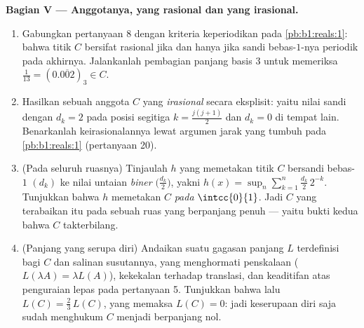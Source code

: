 \begin{problem}[{Soal akhir pekan --- \omterm{pb:b1:topology:1}{himpunan Cantor} sepertiga
tengah: panjang nol, takterbilang, sempurna, dan $C + C =
\intcc{0}{2}$}]
\medskip
\noindent\textbf{Bagian V --- Anggotanya, yang rasional dan yang irasional.}
\begin{enumerate}[resume]
  \item Gabungkan pertanyaan 8 dengan kriteria keperiodikan pada
        \cref{pb:b1:reals:1}: bahwa titik $C$ bersifat rasional jika dan
        hanya jika sandi bebas-$1$-nya periodik pada akhirnya. Jalankanlah
        pembagian panjang basis $3$ untuk memeriksa $\frac1{13} =
        (0.\overline{002})_3 \in C$.
  \item Hasilkan sebuah anggota $C$ yang \emph{irasional} secara eksplisit:
        yaitu nilai sandi dengan $d_k = 2$ pada posisi
        segitiga $k = \frac{j(j+1)}{2}$ dan $d_k = 0$
        di tempat lain. Benarkanlah keirasionalannya lewat argumen jarak yang
        tumbuh pada \cref{pb:b1:reals:1} (pertanyaan 20).
  \item (Pada seluruh ruasnya) Tinjaulah $h$ yang memetakan titik
        $C$ bersandi bebas-$1$ $(d_k)$ ke nilai untaian
        \emph{biner} $\bigl(\frac{d_k}2\bigr)$, yakni
        $h(x) = \sup_n \sum_{k=1}^n \frac{d_k}{2}\,2^{-k}$.
        Tunjukkan bahwa $h$ memetakan $C$ \emph{pada} $\intcc{0}{1}$. Jadi
        $C$ yang terabaikan itu  pada sebuah ruas yang berpanjang
        penuh --- yaitu bukti kedua bahwa $C$ takterbilang.
  \item (Panjang yang serupa diri) Andaikan suatu gagasan panjang $L$
        terdefinisi bagi $C$ dan salinan susutannya, yang menghormati
        penskalaan ($L(\lambda A) = \lambda L(A)$), kekekalan terhadap translasi,
        dan keaditifan atas penguraian lepas
        pada pertanyaan 5. Tunjukkan bahwa lalu $L(C) = \frac23\,L(C)$,
        yang memaksa $L(C) = 0$: jadi keserupaan diri saja sudah
        menghukum $C$ menjadi berpanjang nol.
\end{enumerate}


\end{problem}

